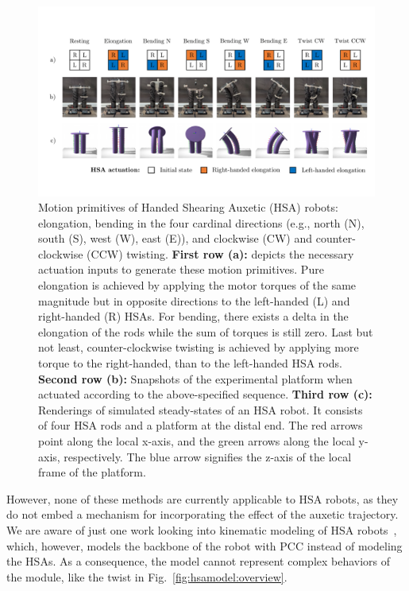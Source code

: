 \begin{figure}[hbt]
    \centering
    \includegraphics[width=1.0\textwidth]{hsamodel/figures/motion_primitives/motion_primitives_v2_compressed.pdf}
    
    \caption{Motion primitives of Handed Shearing Auxetic (HSA) robots: elongation, bending in the four cardinal directions (e.g., north (N), south (S), west (W), east (E)), and clockwise (CW) and counter-clockwise (CCW) twisting.
    \textbf{First row (a):} depicts the necessary actuation inputs to generate these motion primitives. Pure elongation is achieved by applying the motor torques of the same magnitude but in opposite directions to the left-handed (L) and right-handed (R) HSAs. For bending, there exists a delta in the elongation of the rods while the sum of torques is still zero. Last but not least, counter-clockwise twisting is achieved by applying more torque to the right-handed, than to the left-handed HSA rods.
    \textbf{Second row (b):} Snapshots of the experimental platform when actuated according to the above-specified sequence.
    \textbf{Third row (c):} Renderings of simulated steady-states of an HSA robot. It consists of four HSA rods and a platform at the distal end. The red arrows point along the local x-axis, and the green arrows along the local y-axis, respectively. The blue arrow signifies the z-axis of the local frame of the platform.}\label{fig:hsamodel:motion_primitives}
\end{figure}

However, none of these methods are currently applicable to HSA robots, as they do not embed a mechanism for incorporating the effect of the auxetic trajectory.
%
We are aware of just one work looking into kinematic modeling of HSA robots~\citep{garg2022kinematic}, which, however, models the backbone of the robot with \gls{PCC} instead of modeling the HSAs. As a consequence, the model cannot represent complex behaviors of the module, like the twist in Fig.~\ref{fig:hsamodel:overview}. 

